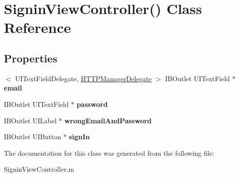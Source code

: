 \hypertarget{interface_signin_view_controller_07_08}{\section{\-Signin\-View\-Controller() \-Class \-Reference}
\label{interface_signin_view_controller_07_08}
}
\subsection*{\-Properties}
\begin{DoxyCompactItemize}
\item 
\hypertarget{interface_signin_view_controller_07_08_a37d9030c9fec8dbd5cf488e353f1c5ac}{$<$ \-U\-I\-Text\-Field\-Delegate, \*
\hyperlink{protocol_h_t_t_p_manager_delegate-p}{\-H\-T\-T\-P\-Manager\-Delegate} $>$ \-I\-B\-Outlet \*
\-U\-I\-Text\-Field $\ast$ {\bfseries email}}\label{interface_signin_view_controller_07_08_a37d9030c9fec8dbd5cf488e353f1c5ac}

\item 
\hypertarget{interface_signin_view_controller_07_08_a7afa5b92d29448b889bb3c8296e3cbe0}{\-I\-B\-Outlet \-U\-I\-Text\-Field $\ast$ {\bfseries password}}\label{interface_signin_view_controller_07_08_a7afa5b92d29448b889bb3c8296e3cbe0}

\item 
\hypertarget{interface_signin_view_controller_07_08_ae2144fd28fdba90eb581a7f893b364dc}{\-I\-B\-Outlet \-U\-I\-Label $\ast$ {\bfseries wrong\-Email\-And\-Password}}\label{interface_signin_view_controller_07_08_ae2144fd28fdba90eb581a7f893b364dc}

\item 
\hypertarget{interface_signin_view_controller_07_08_aced39124899a7dab60f2c8c562ba266c}{\-I\-B\-Outlet \-U\-I\-Button $\ast$ {\bfseries sign\-In}}\label{interface_signin_view_controller_07_08_aced39124899a7dab60f2c8c562ba266c}

\end{DoxyCompactItemize}


\-The documentation for this class was generated from the following file\-:\begin{DoxyCompactItemize}
\item 
\-Signin\-View\-Controller.\-m\end{DoxyCompactItemize}
